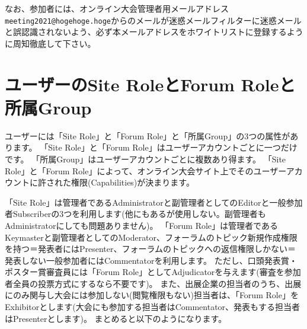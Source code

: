 \documentclass[titlepage,10pt,a4paper,uplatex]{jsbook}
\begin{document}
なお、参加者には、オンライン大会管理者用メールアドレス\texttt{meeting2021@hogehoge.hoge}からのメールが迷惑メールフィルターに迷惑メールと誤認識されないよう、必ず本メールアドレスをホワイトリストに登録するように周知徹底して下さい。

\section{ユーザーのSite RoleとForum Roleと所属Group}

ユーザーには「Site Role」と「Forum Role」と「所属Group」の3つの属性があります。
「Site Role」と「Forum Role」はユーザーアカウントごとに一つだけです。
「所属Group」はユーザーアカウントごとに複数あり得ます。
「Site Role」と「Forum Role」によって、オンライン大会サイト上でそのユーザーアカウントに許された権限(Capabilities)が決まります。

「Site Role」は管理者であるAdministratorと副管理者としてのEditorと一般参加者Subscriberの3つを利用します(他にもあるが使用しない。副管理者もAdministratorにしても問題ありません)。
「Forum Role」は管理者であるKeymasterと副管理者としてのModerator、フォーラムのトピック新規作成権限を持つ＝発表者にはPresenter、フォーラムのトピックへの返信権限しかない＝発表しない一般参加者にはCommentatorを利用します。
ただし、口頭発表賞・ポスター賞審査員には「Forum Role」としてAdjudicatorを与えます(審査を参加者全員の投票方式にするなら不要です)。
また、出展企業の担当者のうち、出展にのみ関与し大会には参加しない(閲覧権限もない)担当者は、「Forum Role」をExhibitorとします(大会にも参加する担当者はCommentator、発表もする担当者はPresenterとします)。
まとめると以下のようになります。
\end{document}
